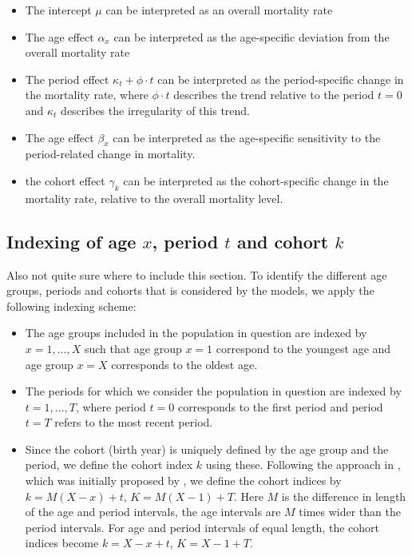 \begin{itemize}
    \item The intercept $\mu$ can be interpreted as an overall mortality rate
    \item The age effect $\alpha_x$ can be interpreted as the age-specific deviation from the overall mortality rate
    \item The period effect $\kappa_t + \phi \cdot t$ can be interpreted as the period-specific change in the mortality rate, where $\phi \cdot t$ describes the trend relative to the period $t = 0$ and $\kappa_t$ describes the irregularity of this trend. 
    \item The age effect $\beta_x$ can be interpreted as the age-specific sensitivity to the period-related change in mortality. 
    \item the cohort effect $\gamma_k$ can be interpreted as the cohort-specific change in the mortality rate, relative to the overall mortality level. 
\end{itemize}

\subsection{Indexing of age $x$, period $t$ and cohort $k$}
\textcolor{myDarkGreen}{Also not quite sure where to include this section. }
To identify the different age groups, periods and cohorts that is considered by the models, we apply the following indexing scheme:
\begin{itemize}
    \item The age groups included in the population in question are indexed by $x = 1,\ldots,X$ such that age group $x=1$ correspond to the youngest age and age group $x=X$ corresponds to the oldest age.
    \item The periods for which we consider the population in question are indexed by $t=1,\ldots,T$, where period $t=0$ corresponds to the first period and period $t = T$ refers to the most recent period. 
    \item Since the cohort (birth year) is uniquely defined by the age group and the period, we define the cohort index $k$ using these. Following the approach in \cite{rieblerHeld2010}, which was initially proposed by \cite{Heuer1997}, we define the cohort indices by $k = M(X - x) + t$, $K = M(X - 1) + T$. Here $M$ is the difference in length of the age and period intervals, the age intervals are $M$ times wider than the period intervals. For age and period intervals of equal length, the cohort indices become $k = X - x + t$, $K = X - 1 + T.$
\end{itemize}
